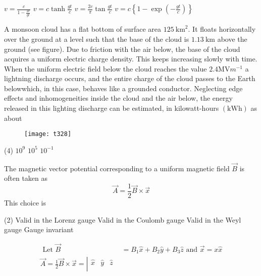 \begin{questions}
\begin{tasks}
	\task[\textbf{A.}] $v=\frac{c}{1-\frac{2 c}{g t}}$
	\task[\textbf{B.}]   $v=c \tanh \frac{g t}{c}$
	\task[\textbf{C.}] $v=\frac{2 c}{\pi} \tan \frac{g t}{c}$
	\task[\textbf{D.}] $v=c\left\{1-\exp \left(-\frac{g t}{c}\right)\right\}$
\end{tasks}
\begin{minipage}{\textwidth}
	\question A monsoon cloud has a flat bottom of surface area $125 \mathrm{~km}^{2}$. It floats horizontally over the ground at a level such that the base of the cloud is $1.13 \mathrm{~km}$ above the ground (see figure). Due to friction with the air below, the base of the cloud acquires a uniform electric charge density. This keeps increasing slowly with time.
	When the uniform electric field below the cloud reaches the value $2.4 \mathrm{MV} m^{-1}$ a lightning discharge occurs, and the entire charge of the cloud passes to the Earth belowwhich, in this case, behaves like a grounded conductor. Neglecting edge effects and inhomogeneities inside the cloud and the air below, the energy released in this lighting discharge can be estimated, in kilowatt-hours $(\mathrm{kWh})$ as about
\end{minipage}
\begin{figure}[H]
	\centering
	\texttt{[image: t328]}
\end{figure}
\begin{tasks}(4)
	\task[\textbf{A.}] $10^{9}$
	\task[\textbf{B.}] $10^{5}$
	\task[\textbf{D.}] $10^{-1}$
\end{tasks}
\begin{minipage}{\textwidth}
	\question The magnetic vector potential corresponding to a uniform magnetic field $\vec{B}$ is often taken as
	$$
	\vec{A}=\frac{1}{2} \vec{B} \times \vec{x}
	$$
	This choice is
\end{minipage}
\begin{tasks}(2)
	\task[\textbf{A.}] Valid in the Lorenz gauge
	\task[\textbf{B.}] Valid in the Coulomb gauge
	\task[\textbf{C.}] Valid in the Weyl gauge
	\task[\textbf{D.}] Gauge invariant
\end{tasks}
\begin{answer}
	\begin{align*}
	\text { Let } \vec{B}&=B_{1} \hat{x}+B_{2} \hat{y}+B_{3} \hat{z} \text { and } \vec{x}=x \hat{x}\\
	\vec{A}=\frac{1}{2} \vec{B} \times \vec{x}=\left|\begin{array}{ccc}
	\hat{x} & \hat{y} & \hat{z} \\

\end{array}
\end{align*}
\end{answer}
\end{questions}
